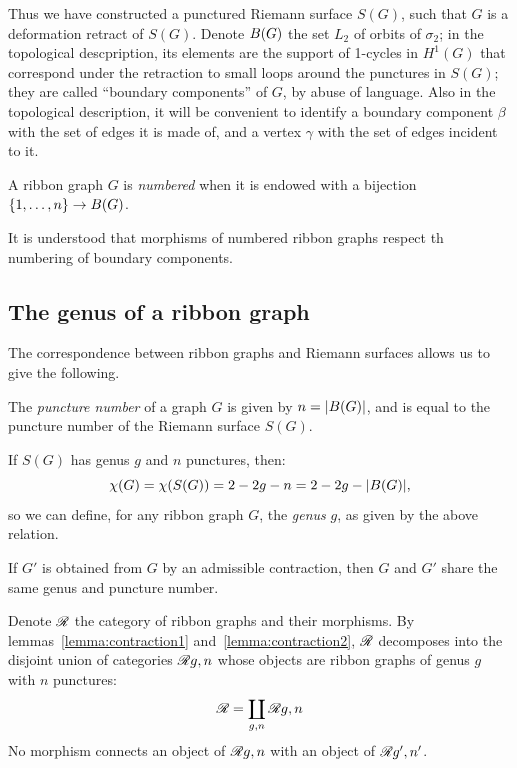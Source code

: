 Thus we have constructed a punctured Riemann surface $S(G)$, such that
$G$ is a deformation retract of $S(G)$.  Denote $B(G)$ the set
$L_2$ of orbits of $\sigma_2$; in the topological descpription, its
elements are the support of 1-cycles in $H^1(G)$ that correspond under
the retraction to small loops around the punctures in $S(G)$; they are
called ``boundary components'' of $G$, by abuse of language.  Also in
the topological description, it will be convenient to identify a
boundary component $\beta$ with the set of edges it is made of, and a
vertex $\gamma$ with the set of edges incident to it.

\begin{definition}
  A ribbon graph $G$ is \emph{numbered} when it is endowed with a
  bijection $\{1,\ldots, n\} \to B(G)$.

  It is understood that morphisms of numbered ribbon graphs respect th
  numbering of boundary components.
\end{definition}


\subsection{The genus of a ribbon graph}
\label{sec:rg-genus}

The correspondence between ribbon graphs and Riemann surfaces allows
us to give the following.
\begin{definition}\label{dfn:rg-genus}
  The \emph{puncture number} of a graph $G$ is given by $n =
  \lvert B(G)\rvert$, and is equal to the puncture number of the
  Riemann surface $S(G)$.

  If $S(G)$ has genus $g$ and $n$ punctures, then:
  \begin{equation*}
    \chi(G) = \chi(S(G)) = 2 - 2g - n = 2 - 2g - \lvert B(G)\rvert,
  \end{equation*}
  so we can define, for any ribbon graph $G$, the \emph{genus} $g$, as
  given by the above relation.
\end{definition}

\begin{lemma}\label{lemma:contraction2}
  If $G'$ is obtained from $G$ by an admissible contraction, then $G$
  and $G'$ share the same genus and puncture number.
\end{lemma}

Denote $\mathscr{R}_{}$ the category of ribbon graphs and their morphisms.  By
lemmas~\ref{lemma:contraction1} and~\ref{lemma:contraction2}, $\mathscr{R}_{}$
decomposes into the disjoint union of categories $\mathscr{R}_{}{g,n}$ whose
objects are ribbon graphs of genus $g$ with $n$ punctures:
\begin{equation*}
  \mathscr{R}_{} = \coprod_{g,n} \mathscr{R}_{}{g,n}
\end{equation*}
No morphism connects an object of $\mathscr{R}_{}{g,n}$ with an object of
$\mathscr{R}_{}{g',n'}$.


